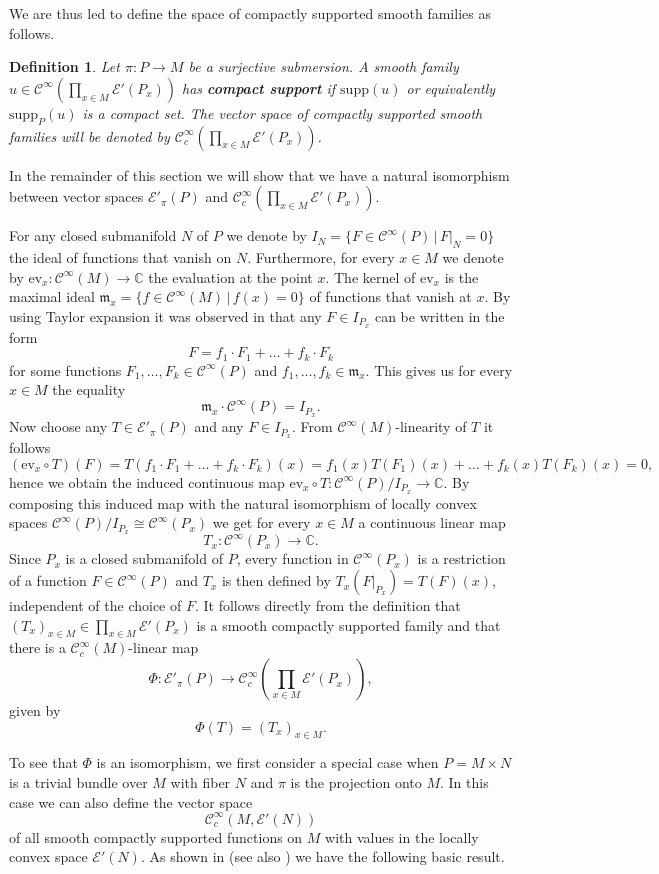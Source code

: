 \documentclass[a4paper]{amsart}
\newtheorem{dfn}{Definition}[section]
\newcommand{\CC}{\mathbb{C}}
\newcommand{\cE}{\mathcal{E}}
\newcommand{\fm}{\mathfrak{m}}
\newcommand{\ev}{\mathord{\mathrm{ev}}}
\newcommand{\supp}{\mathord{\mathrm{supp}}}
\newcommand{\C}{\mathord{\mathcal{C}^{\infty}}}
\newcommand{\Cc}{\mathord{\mathcal{C}^{\infty}_{c}}}
\begin{document}
We are thus led to define the space of compactly supported smooth families as follows.

\begin{dfn}
Let $\pi:P\to M$ be a surjective submersion.
A smooth family $u\in\C(\prod_{x\in M}\cE'(P_{x}))$ has \textbf{compact support} if $\supp(u)$ or equivalently $\supp_{P}(u)$ is
a compact set. The vector space of compactly supported smooth families will be denoted by $\Cc(\prod_{x\in M}\cE'(P_{x}))$.
\end{dfn}

In the remainder of this section we will show that we have a natural isomorphism between
vector spaces $\cE'_{\pi}(P)$ and $\Cc(\prod_{x\in M}\cE'(P_{x}))$.

For any closed submanifold $N$ of $P$ we denote by 
$I_{N}=\{F\in\C(P)\,|\,F|_{N}=0\}$ the ideal of functions that vanish on $N$. Furthermore,
for every $x\in M$ we denote by $\ev_{x}:\C(M)\to\CC$ the evaluation at the point $x$. The kernel of $\ev_{x}$ is
the maximal ideal $\fm_{x}=\{f\in\C(M)\,|\,f(x)=0\}$ of functions that vanish at $x$.
By using Taylor expansion it was observed in \cite{LeMaVa17} that any $F\in I_{P_{x}}$ can be written in the form
\[
F=f_{1}\cdot F_{1}+\ldots+f_{k}\cdot F_{k}
\]
for some functions $F_{1},\ldots,F_{k}\in\C(P)$ and $f_{1},\ldots,f_{k}\in\fm_{x}$. This gives us for every
$x\in M$ the equality
\[
\fm_{x}\cdot\C(P)=I_{P_{x}}.
\]
Now choose any $T\in\cE'_{\pi}(P)$ and any $F\in I_{P_{x}}$. From $\C(M)$-linearity of $T$ it follows 
\[
(\ev_{x}\circ T)(F)=T(f_{1}\cdot F_{1}+\ldots+f_{k}\cdot F_{k})(x)=f_{1}(x)T(F_{1})(x)+\ldots+f_{k}(x)T(F_{k})(x)=0,
\]
hence we obtain the induced continuous map $\ev_{x}\circ T:\C(P)/I_{P_{x}}\to\CC$. By composing this induced map 
with the natural isomorphism of locally convex spaces $\C(P)/I_{P_{x}}\cong\C(P_{x})$ we get for every $x\in M$ a continuous linear map
\[
T_{x}:\C(P_{x})\to\CC.
\]
Since $P_{x}$ is a closed submanifold of $P$, every function in $\C(P_{x})$ is a restriction of a function $F\in\C(P)$ and $T_{x}$
is then defined by $T_{x}(F|_{P_{x}})=T(F)(x)$, independent of the choice of $F$. It follows directly from the definition
that $(T_{x})_{x\in M}\in\prod_{x\in M}\cE'(P_{x})$ is a smooth compactly supported family and that there is a $\Cc(M)$-linear map
\[
\Phi:\cE'_{\pi}(P)\to\Cc(\prod_{x\in M}\cE'(P_{x})),
\]
given by
\[
\Phi(T)=(T_{x})_{x\in M}.
\]

To see that $\Phi$ is an isomorphism, we first consider a special case 
when $P=M\times N$ is a trivial bundle over $M$ with fiber $N$ and $\pi$ is the projection onto $M$.
In this case we can also define the vector space
\[
\Cc(M,\cE'(N))
\]
of all smooth compactly supported functions on $M$ with values in the locally convex space $\cE'(N)$. 
As shown in \cite{LeMaVa17} (see also \cite{Kal22}) we have the following basic result.
\end{document}
